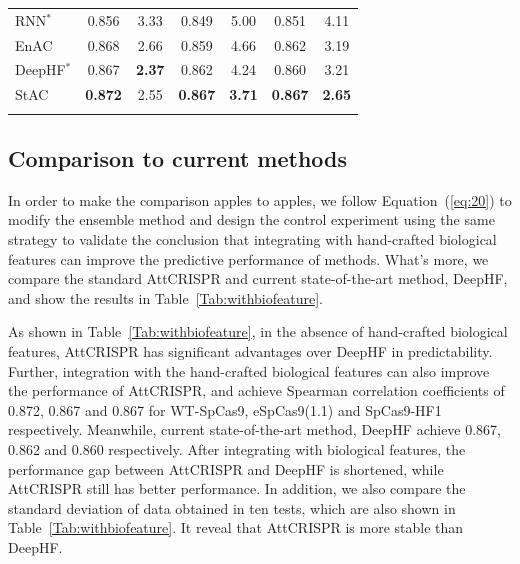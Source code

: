\documentclass{bioinfo}
\begin{document}
\begin{table}[!tpb]
{\begin{tabular}{lcccccc}
        RNN$^*$ & 0.856 & 3.33 & 0.849 & 5.00 & 0.851 & 4.11 \\
        EnAC   & 0.868 & 2.66 & 0.859 & 4.66 & 0.862 & 3.19 \\
        DeepHF$^*$ & 0.867 & \textbf{2.37} & 0.862 & 4.24 & 0.860 & 3.21 \\
        StAC   & \textbf{0.872} & 2.55 & \textbf{0.867} & \textbf{3.71} & \textbf{0.867} & \textbf{2.65} \\
     \botrule
\end{tabular}}\footnotesize{}
\end{table}

\subsection{Comparison to current methods}\label{section:comparison}

In order to make the comparison apples to apples, 
we follow Equation~(\ref{eq:20}) to modify the ensemble method and design the control experiment using the same strategy to validate the conclusion that integrating with hand-crafted biological features can improve the predictive performance of methods. 
What's more, we compare the standard AttCRISPR and current state-of-the-art method, DeepHF, and show the results in Table~\ref{Tab:withbiofeature}. 

As shown in Table~\ref{Tab:withbiofeature}, in the absence of hand-crafted biological features, AttCRISPR has significant advantages over DeepHF in predictability. 
Further, integration with the hand-crafted biological features can also improve the performance of AttCRISPR, and achieve Spearman correlation coefficients of 0.872, 0.867 and 0.867 for WT-SpCas9, eSpCas9(1.1) and SpCas9-HF1 respectively. Meanwhile, current state-of-the-art method, DeepHF achieve 0.867, 0.862 and 0.860 respectively. 
After integrating with biological features, the performance gap between AttCRISPR and DeepHF is shortened, while AttCRISPR still has better performance. In addition, we also compare the standard deviation of data obtained in ten tests, which are also shown in Table~\ref{Tab:withbiofeature}. 
It reveal that AttCRISPR is more stable than DeepHF.
\end{document}
